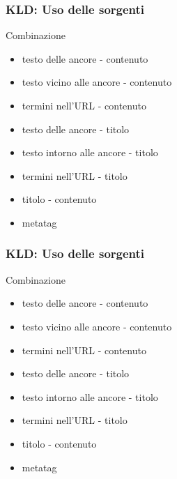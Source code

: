 \documentclass{beamer}
\begin{document}
\begin{frame}
  \frametitle{KLD: Uso delle sorgenti}
  \begin{block}{Combinazione}
  \begin{itemize}
      \item testo delle ancore - contenuto  
      \item testo vicino alle ancore - contenuto
      \item termini nell’URL - contenuto
      \item testo delle ancore - titolo
      \item testo intorno alle ancore - titolo
      \item termini nell’URL - titolo
      \item titolo - contenuto
      \item metatag
  \end{itemize}
  \end{block}
\end{frame}
\begin{frame}
  \frametitle{KLD: Uso delle sorgenti}
  \begin{block}{Combinazione}
  \begin{itemize}
      \item testo delle ancore - contenuto  
      \item testo vicino alle ancore - contenuto
      \item termini nell’URL - contenuto
      \item testo delle ancore - titolo
      \item testo intorno alle ancore - titolo
      \item termini nell’URL - titolo
      \item titolo - contenuto
      \item metatag
  \end{itemize}
  \end{block}
\end{frame}
\end{document}
